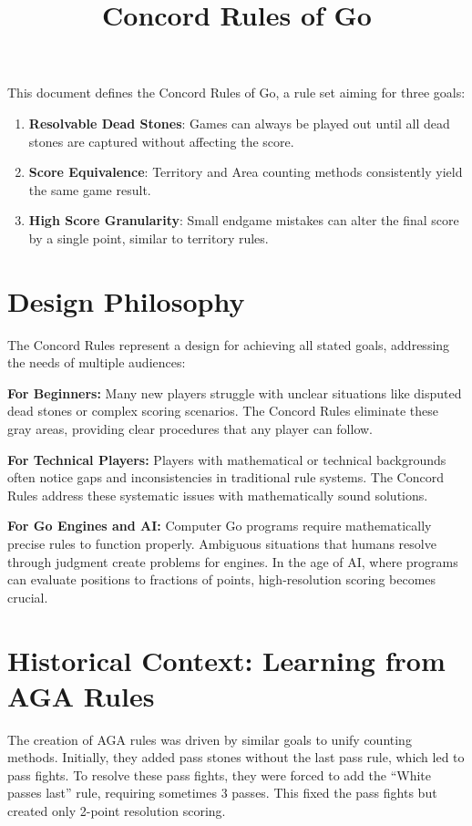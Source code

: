 \documentclass[11pt]{article}
\title{Concord Rules of Go}
\author{}
\date{}
\begin{document}
\maketitle

This document defines the Concord Rules of Go, a rule set aiming for three goals:

\begin{enumerate}
\item \textbf{Resolvable Dead Stones}: Games can always be played out until all dead stones are captured without affecting the score.
\item \textbf{Score Equivalence}: Territory and Area counting methods consistently yield the same game result.
\item \textbf{High Score Granularity}: Small endgame mistakes can alter the final score by a single point, similar to territory rules.
\end{enumerate}

\section{Design Philosophy}

The Concord Rules represent a design for achieving all stated goals, addressing the needs of multiple audiences:

\textbf{For Beginners:} Many new players struggle with unclear situations like disputed dead stones or complex scoring scenarios.
The Concord Rules eliminate these gray areas, providing clear procedures that any player can follow.

\textbf{For Technical Players:} Players with mathematical or technical backgrounds often notice gaps and inconsistencies in traditional rule systems.
The Concord Rules address these systematic issues with mathematically sound solutions.

\textbf{For Go Engines and AI:} Computer Go programs require mathematically precise rules to function properly.
Ambiguous situations that humans resolve through judgment create problems for engines.
In the age of AI, where programs can evaluate positions to fractions of points, high-resolution scoring becomes crucial.

\section{Historical Context: Learning from AGA Rules}

The creation of AGA rules was driven by similar goals to unify counting methods.
Initially, they added pass stones without the last pass rule, which led to pass fights.
To resolve these pass fights, they were forced to add the ``White passes last'' rule, requiring sometimes 3 passes.
This fixed the pass fights but created only 2-point resolution scoring.
\end{document}

